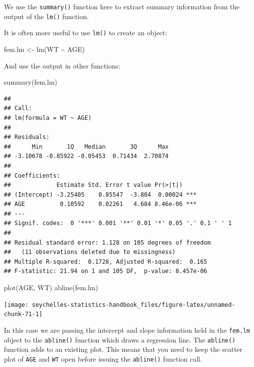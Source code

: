 \documentclass[
  12pt,
]{book}
\newenvironment{Shaded}{\begin{snugshade}}{\end{snugshade}}
\newcommand{\FunctionTok}[1]{\textcolor[rgb]{0.00,0.00,0.00}{#1}}
\newcommand{\NormalTok}[1]{#1}
\newcommand{\OtherTok}[1]{\textcolor[rgb]{0.56,0.35,0.01}{#1}}
\newcommand{\SpecialCharTok}[1]{\textcolor[rgb]{0.00,0.00,0.00}{#1}}
\begin{document}
We use the \texttt{summary()} function here to extract summary information from the output of the \texttt{lm()} function.

It is often more useful to use \texttt{lm()} to create an object:

\begin{Shaded}
\begin{Highlighting}[]
\NormalTok{fem.lm }\OtherTok{\textless{}{-}} \FunctionTok{lm}\NormalTok{(WT }\SpecialCharTok{\textasciitilde{}}\NormalTok{ AGE)}
\end{Highlighting}
\end{Shaded}

\newpage

And use the output in other functions:

\begin{Shaded}
\begin{Highlighting}[]
\FunctionTok{summary}\NormalTok{(fem.lm)}
\end{Highlighting}
\end{Shaded}

\begin{verbatim}
## 
## Call:
## lm(formula = WT ~ AGE)
## 
## Residuals:
##      Min       1Q   Median       3Q      Max 
## -3.10678 -0.85922 -0.05453  0.71434  2.70874 
## 
## Coefficients:
##             Estimate Std. Error t value Pr(>|t|)    
## (Intercept) -3.25405    0.85547  -3.804  0.00024 ***
## AGE          0.10592    0.02261   4.684 8.46e-06 ***
## ---
## Signif. codes:  0 '***' 0.001 '**' 0.01 '*' 0.05 '.' 0.1 ' ' 1
## 
## Residual standard error: 1.128 on 105 degrees of freedom
##   (11 observations deleted due to missingness)
## Multiple R-squared:  0.1728, Adjusted R-squared:  0.165 
## F-statistic: 21.94 on 1 and 105 DF,  p-value: 8.457e-06
\end{verbatim}

\newpage

\begin{Shaded}
\begin{Highlighting}[]
\FunctionTok{plot}\NormalTok{(AGE, WT)}
\FunctionTok{abline}\NormalTok{(fem.lm)}
\end{Highlighting}
\end{Shaded}

\begin{center}\texttt{[image: seychelles-statistics-handbook\_files/figure-latex/unnamed-chunk-71-1]} \end{center}

In this case we are passing the intercept and slope information held in the \texttt{fem.lm} object to the \texttt{abline()} function which draws a regression line. The \texttt{abline()} function adds to an existing plot. This means that you need to keep the scatter plot of \texttt{AGE} and \texttt{WT} open before issuing the \texttt{abline()} function call.
\end{document}
